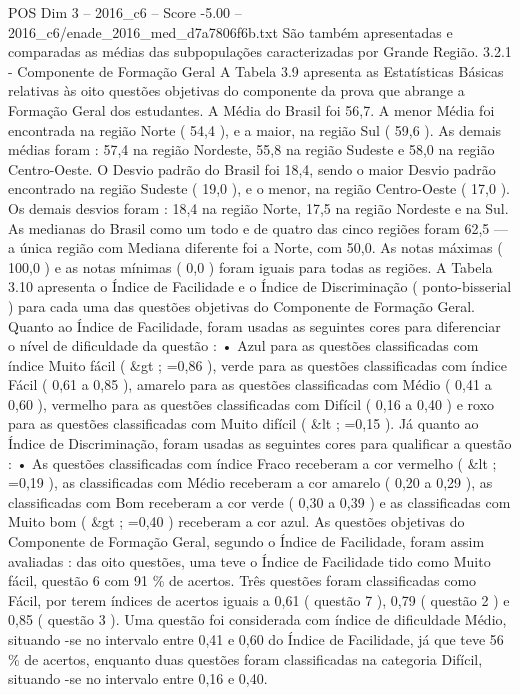 \begin{textsample}{POS Dim 3 – 2016\_c6 – Score -5.00 – 2016\_c6/enade\_2016\_med\_d7a7806f6b.txt}
São também apresentadas e comparadas as médias das subpopulações caracterizadas por Grande Região. 3.2.1 - Componente de Formação Geral A Tabela 3.9 apresenta as Estatísticas Básicas relativas às oito questões objetivas do componente da prova que abrange a Formação Geral dos estudantes.
A Média do Brasil foi 56,7.
A menor Média foi encontrada na região Norte ( 54,4 ), e a maior, na região Sul ( 59,6 ).
As demais médias foram : 57,4 na região Nordeste, 55,8 na região Sudeste e 58,0 na região Centro-Oeste.
O Desvio padrão do Brasil foi 18,4, sendo o maior Desvio padrão encontrado na região Sudeste ( 19,0 ), e o menor, na região Centro-Oeste ( 17,0 ).
Os demais desvios foram : 18,4 na região Norte, 17,5 na região Nordeste e na Sul.
As medianas do Brasil como um todo e de quatro das cinco regiões foram 62,5 — a única região com Mediana diferente foi a Norte, com 50,0.
As notas máximas ( 100,0 ) e as notas mínimas ( 0,0 ) foram iguais para todas as regiões.
A Tabela 3.10 apresenta o Índice de Facilidade e o Índice de Discriminação ( ponto-bisserial ) para cada uma das questões objetivas do Componente de Formação Geral.
Quanto ao Índice de Facilidade, foram usadas as seguintes cores para diferenciar o nível de dificuldade da questão : • Azul para as questões classificadas com índice Muito fácil ( \&gt ; =0,86 ), verde para as questões classificadas com índice Fácil ( 0,61 a 0,85 ), amarelo para as questões classificadas com Médio ( 0,41 a 0,60 ), vermelho para as questões classificadas com Difícil ( 0,16 a 0,40 ) e roxo para as questões classificadas com Muito difícil ( \&lt ; =0,15 ).
Já quanto ao Índice de Discriminação, foram usadas as seguintes cores para qualificar a questão : • As questões classificadas com índice Fraco receberam a cor vermelho ( \&lt ; =0,19 ), as classificadas com Médio receberam a cor amarelo ( 0,20 a 0,29 ), as classificadas com Bom receberam a cor verde ( 0,30 a 0,39 ) e as classificadas com Muito bom ( \&gt ; =0,40 ) receberam a cor azul.
As questões objetivas do Componente de Formação Geral, segundo o Índice de Facilidade, foram assim avaliadas : das oito questões, uma teve o Índice de Facilidade tido como Muito fácil, questão 6 com 91 \% de acertos.
Três questões foram classificadas como Fácil, por terem índices de acertos iguais a 0,61 ( questão 7 ), 0,79 ( questão 2 ) e 0,85 ( questão 3 ).
Uma questão foi considerada com índice de dificuldade Médio, situando -se no intervalo entre 0,41 e 0,60 do Índice de Facilidade, já que teve 56 \% de acertos, enquanto duas questões foram classificadas na categoria Difícil, situando -se no intervalo entre 0,16 e 0,40.

\end{textsample}
